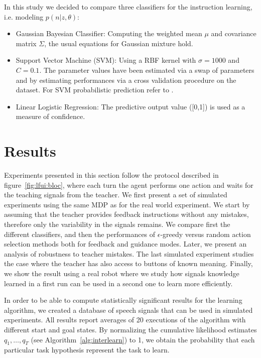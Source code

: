 In this study we decided to compare three classifiers for the instruction learning, i.e. modeling $p(n|z,\theta)$:
\begin{itemize}
\item Gaussian Bayesian Classifier: Computing the weighted mean $\mu$ and covariance matrix $\Sigma$, the usual equations for Gaussian mixture hold.
\item Support Vector Machine (SVM): Using a RBF kernel with $\sigma = 1000$ and $C = 0.1$. The parameter values have been estimated via a swap of parameters and by estimating performances via a cross validation procedure on the dataset. For SVM probabilistic prediction refer to \cite{platt1999probabilistic}.
\item Linear Logistic Regression: The predictive output value ([0,1]) is used as a measure of confidence.
\end{itemize}

\section{Results}

Experiments presented in this section follow the protocol described in figure~\ref{fig:lfui:bloc}, where each turn the agent performs one action and waits for the teaching signals from the teacher. We first present a set of simulated experiments using the same MDP as for the real world experiment. We start by assuming that the teacher provides feedback instructions without any mistakes, therefore only the variability in the signals remains. We compare first the different classifiers, and then the performances of $\epsilon$-greedy versus random action selection methods both for feedback and guidance modes. Later, we present an analysis of robustness to teacher mistakes. The last simulated experiment studies the case where the teacher has also access to buttons of known meaning. Finally, we show the result using a real robot where we study how signals knowledge learned in a first run can be used in a second one to learn more efficiently.

In order to be able to compute statistically significant results for the learning algorithm, we created a database of speech signals that can be used in simulated experiments. All results report averages of 20 executions of the algorithm with different start and goal states. By normalizing the cumulative likelihood estimates $q_1,\ldots,q_T$ (see Algorithm~\ref{alg:interlearn}) to 1, we obtain the probability that each particular task hypothesis represent the task to learn.

